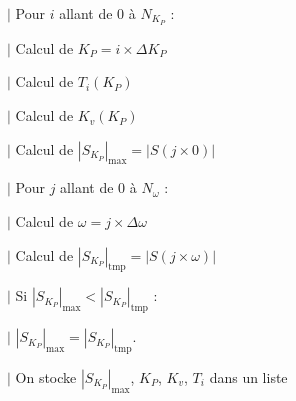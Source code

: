\ifprof
\begin{corrige}

\noindent \hspace{.4cm} $|$ Pour $i$ allant de 0 à $N_{K_P}$ :  

\noindent \hspace{.8cm} $|$ Calcul de $K_P=i\times \Delta K_P$ 

\noindent \hspace{.8cm} $|$ Calcul de $T_i \left( K_P\right)$ 

\noindent \hspace{.8cm} $|$ Calcul de $K_v\left( K_P\right)$ 

\noindent \hspace{.8cm} $|$ Calcul de $\left| S_{K_P} \right|_{\text{max}}=\left| S\left( j \times 0\right) \right|$

\noindent \hspace{.8cm} $|$ Pour $j$ allant de 0 à $N_{\omega}$ :  

\noindent \hspace{1.2cm} $|$ Calcul de $\omega=j\times \Delta \omega$ 

\noindent \hspace{1.2cm} $|$ Calcul de $\left| S_{K_P} \right|_{\text{tmp}}=\left| S\left( j \times \omega \right) \right|$

\noindent \hspace{1.2cm} $|$ Si $\left| S_{K_P} \right|_{\text{max}}< \left| S_{K_P} \right|_{\text{tmp}}$ :

\noindent \hspace{1.6cm} $|$ $\left| S_{K_P} \right|_{\text{max}}= \left| S_{K_P} \right|_{\text{tmp}}$.

\noindent \hspace{.8cm} $|$ On stocke $\left| S_{K_P} \right|_{\text{max}}$, $K_P$, $K_v$, $T_i$ dans un liste


\end{corrige}
\else
\fi

